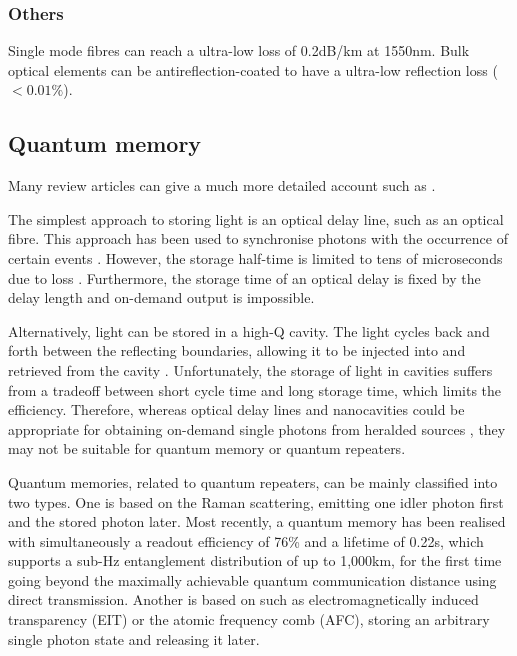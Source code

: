 \documentclass[aps, rmp, twocolumn, amsmath, amssymb, nofootinbib, superscriptaddress, longbibliography, floatfix, table-of-contents, eqsecnum]{revtex4-1}
\begin{document}
%
%

\subsubsection{Others}

Single mode fibres can reach a ultra-low loss of 0.2dB/km at 1550nm. Bulk optical elements can be antireflection-coated to have a ultra-low reflection loss ($<0.01\%$).

%
%

\subsection{Quantum memory} 

Many review articles can give a much more detailed account such as \cite{lvovsky2009optical, simon2010quantum, sangouard2011quantum, bussieres2013prospective, reiserer2015cavity}.

The simplest approach to storing light is an optical delay line, such as an optical fibre. This approach has been used to synchronise photons with the occurrence of certain events \cite{landry2007quantum}. However, the storage half-time is limited to tens of microseconds due to loss \cite{lvovsky2009optical}. Furthermore, the storage time of an optical delay is fixed by the delay length and on-demand output is impossible.

Alternatively, light can be stored in a high-Q cavity. The light cycles back and forth between the reflecting boundaries, allowing it to be injected into and retrieved from the cavity \cite{pittman2002single, pittman2002cyclical, leung2006quantum, maitre1997quantum, tanabe2007trapping, tanabe2009dynamic}. Unfortunately, the storage of light in cavities suffers from a tradeoff between short cycle time and long storage time, which limits the efficiency. Therefore, whereas optical delay lines and nanocavities could be appropriate for obtaining on-demand single photons from heralded sources \cite{saglamyurek2015quantum, jin2015telecom}, they may not be suitable for quantum memory or quantum repeaters.

Quantum memories, related to quantum repeaters, can be mainly classified into two types. One is based on the Raman scattering, emitting one idler photon first and the stored photon later. Most recently, a quantum memory has been realised with simultaneously a readout efficiency of 76\% and a lifetime of 0.22s, which supports a sub-Hz entanglement distribution of up to 1,000km, for the first time going beyond the maximally achievable quantum communication distance using direct transmission. Another is based on such as electromagnetically induced transparency (EIT) or the atomic frequency comb (AFC), storing an arbitrary single photon state and releasing it later.
\end{document}
